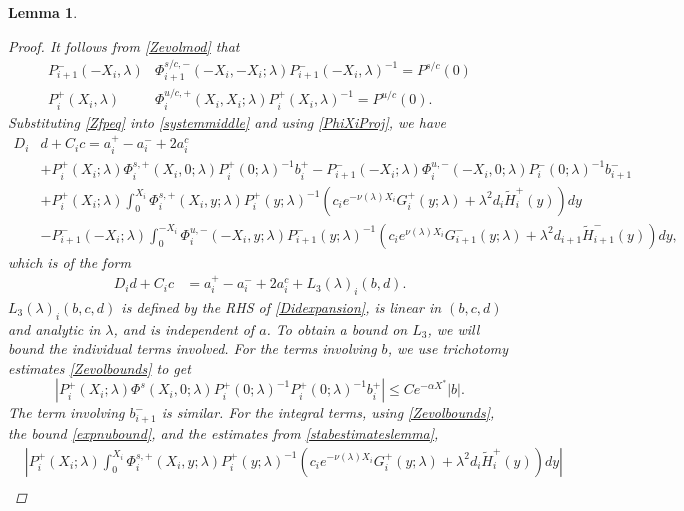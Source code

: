 \documentclass[12pt]{elsarticle}
\theoremstyle{plain}
\newtheorem{lemma}[theorem]{Lemma}
\theoremstyle{definition}
\theoremstyle{remark}
\numberwithin{theorem}{section}
\numberwithin{equation}{section}
\begin{document}
\begin{lemma}
\begin{proof}
It follows from \cref{Zevolmod} that
\begin{equation}\label{PhiXiProj}
\begin{aligned}
P_{i+1}^-(-X_i, \lambda) &\Phi_{i+1}^{s/c,-}(-X_i, -X_i; \lambda) P_{i+1}^-(-X_i, \lambda)^{-1} = P^{s/c}(0) \\
P_i^+(X_i, \lambda) &\Phi^{u/c,+}_{i}(X_i, X_i; \lambda) P_i^+(X_i, \lambda)^{-1} = P^{u/c}(0).
\end{aligned}
\end{equation}
Substituting \cref{Zfpeq} into \cref{systemmiddle} and using \cref{PhiXiProj}, we have
\begin{equation}\label{Didexpansion}
\begin{aligned}
D_i &d + C_i c = a_i^+ - a_i^- + 2 a_i^c \\
&+ P_i^+(X_i; \lambda)\Phi_i^{s,+}(X_i, 0; \lambda) P_i^+(0; \lambda)^{-1} b_i^+ - P_{i+1}^-(-X_i; \lambda)\Phi_i^{u,-}(-X_i, 0; \lambda) P_i^-(0; \lambda)^{-1} b_{i+1}^- \\
&+ P_i^+(X_i; \lambda) \int_0^{X_i} \Phi_i^{s,+}(X_i, y; \lambda)P_i^+(y; \lambda)^{-1} (c_i e^{-\nu(\lambda)X_i} G_i^+(y; \lambda) + \lambda^2 d_i \tilde{H}_i^+(y)) dy \\ 
&- P_{i+1}^-(-X_i; \lambda) \int_0^{-X_i} \Phi_i^{u,-}(-X_i, y; \lambda) P_{i+1}^-(y; \lambda)^{-1}(c_i e^{\nu(\lambda)X_i} G_{i+1}^-(y; \lambda) + \lambda^2 d_{i+1} \tilde{H}_{i+1}^-(y)) dy,
\end{aligned}
\end{equation}
which is of the form
\begin{align}\label{Dideq1}
D_i d + C_i c &= a_i^+ - a_i^- + 2 a_i^c + L_3(\lambda)_i(b, d).
\end{align}
$L_3(\lambda)_i(b, c, d)$ is defined by the RHS of \cref{Didexpansion}, is linear in $(b,c,d)$ and analytic in $\lambda$, and is independent of $a$. To obtain a bound on $L_3$, we will bound the individual terms involved. For the terms involving $b$, we use trichotomy estimates \cref{Zevolbounds} to get
\[
| P_i^+(X_i; \lambda)\Phi^s(X_i, 0; \lambda) P_i^+(0; \lambda)^{-1} P_i^+(0; \lambda)^{-1} b_i^+| \leq C e^{-\alpha X^*} |b|.
\]
The term involving $b_{i+1}^-$ is similar. For the integral terms, using \cref{Zevolbounds}, the bound \cref{expnubound}, and the estimates from \cref{stabestimateslemma},
\begin{align*}
&\left| P_i^+(X_i; \lambda) \int_0^{X_i} \Phi_i^{s,+}(X_i, y; \lambda)P_i^+(y; \lambda)^{-1} (c_i e^{-\nu(\lambda)X_i} G_i^+(y; \lambda) + \lambda^2 d_i \tilde{H}_i^+(y)) dy \right| \\

\end{align*}
\end{proof}
\end{lemma}
\end{document}
